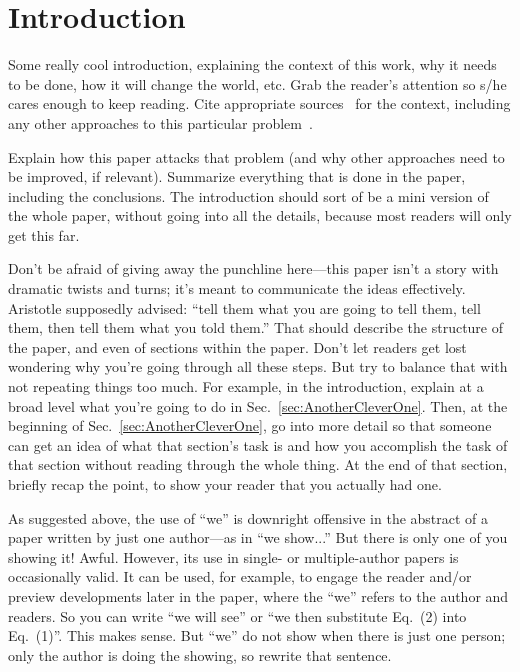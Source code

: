 \documentclass[reprint, aps, prd, letterpaper, noshowpacs, amsmath, %
amssymb, amsfonts, nofootinbib, floatfix, superscriptaddress, %
twoside]{revtex4-1}
\begin{document}
\section{Introduction}
\label{sec:Introduction}

Some really cool introduction, explaining the context of this work,
why it needs to be done, how it will change the world, etc.  Grab the
reader's attention so s/he cares enough to keep reading.  Cite
appropriate sources~\cite{Misner1973, Wald1984} for the context,
including any other approaches to this particular
problem~\cite{Doran2003}.

Explain how this paper attacks that problem (and why other approaches
need to be improved, if relevant).  Summarize everything that is done
in the paper, including the conclusions.  The introduction should sort
of be a mini version of the whole paper, without going into all the
details, because most readers will only get this far.

Don't be afraid of giving away the punchline here---this paper isn't a
story with dramatic twists and turns; it's meant to communicate the
ideas effectively.  Aristotle supposedly advised: ``tell them what you
are going to tell them, tell them, then tell them what you told
them.''  That should describe the structure of the paper, and even of
sections within the paper.  Don't let readers get lost wondering why
you're going through all these steps.  But try to balance that with
not repeating things too much.  For example, in the introduction,
explain at a broad level what you're going to do in
Sec.~\ref{sec:AnotherCleverOne}.  Then, at the beginning of
Sec.~\ref{sec:AnotherCleverOne}, go into more detail so that someone
can get an idea of what that section's task is and how you accomplish
the task of that section without reading through the whole thing.  At
the end of that section, briefly recap the point, to show your reader
that you actually had one.

As suggested above, the use of ``we'' is downright offensive in the
abstract of a paper written by just one author---as in ``we show...''
But there is only one of you showing it!  Awful.  However, its use in
single- or multiple-author papers is occasionally valid.  It can be
used, for example, to engage the reader and/or preview developments
later in the paper, where the ``we'' refers to the author and
readers.  So you can write ``we will see'' or ``we then substitute
Eq.~(2) into Eq.~(1)''.  This makes sense.  But ``we'' do not show
when there is just one person; only the author is doing the showing,
so rewrite that sentence.
\end{document}
